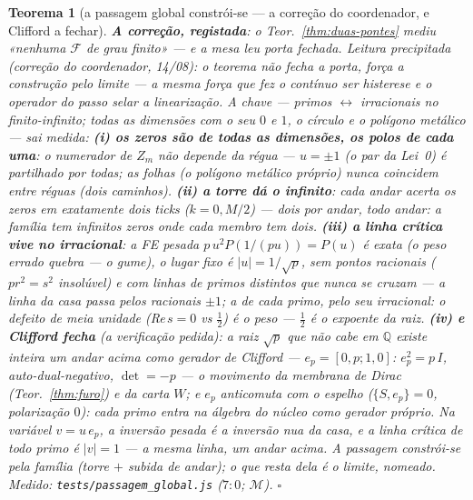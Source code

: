 \documentclass[11pt,a4paper]{article}
\newtheorem{teorema}{Teorema}
\newcommand{\code}[1]{\texttt{\small #1}}
\begin{document}
\begin{teorema}[a passagem global constrói-se --- a correção do
coordenador, e Clifford a fechar]\label{thm:passagem-global}
\textbf{A correção, registada}: o Teor.~\ref{thm:duas-pontes} mediu
«nenhuma $\mathcal{F}$ \emph{de grau finito}» --- e a mesa leu porta
fechada. Leitura precipitada (correção do coordenador, 14/08): o
teorema não fecha a porta, \emph{força a construção pelo limite} ---
a mesma força que fez o contínuo ser histerese e o operador do passo selar a
linearização. A chave --- \emph{primos $\leftrightarrow$ irracionais
no finito-infinito; todas as dimensões com o seu $0$ e $1$, o círculo
e o polígono metálico} --- sai medida:
\textbf{(i) os zeros são de todas as dimensões, os polos de cada
uma}: o numerador de $Z_{m}$ não depende da régua --- $u=\pm1$ (o par
da Lei~0) é partilhado por todas; as folhas (o polígono metálico
próprio) nunca coincidem entre réguas (dois caminhos).
\textbf{(ii) a torre dá o infinito}: cada andar acerta os zeros em
exatamente \emph{dois} ticks ($k=0,M/2$) --- dois por andar, todo
andar: a família tem infinitos zeros onde cada membro tem dois.
\textbf{(iii) a linha crítica vive no irracional}: a FE \emph{pesada}
$p\,u^{2}P(1/(pu))=P(u)$ é exata (o peso errado quebra --- o gume), o
lugar fixo é $|u|=1/\sqrt{p}$, \emph{sem pontos racionais}
($p r^{2}=s^{2}$ insolúvel) e com linhas de primos distintos que
nunca se cruzam --- a linha da casa passa pelos racionais $\pm1$; a
de cada primo, pelo seu irracional: \emph{o defeito de meia unidade
(Re$\,s=0$ vs $\tfrac12$) é o peso --- $\tfrac12$ é o expoente da
raiz}.
\textbf{(iv) e Clifford fecha} (a verificação pedida): a raiz
$\sqrt{p}$ que não cabe em $\mathbb{Q}$ existe \emph{inteira um andar
acima} como gerador de Clifford --- $e_{p}=[0,p;1,0]$:
$e_{p}^{2}=p\,I$, auto-dual-negativo, $\det=-p$ --- o movimento da
membrana de Dirac (Teor.~\ref{thm:furo}) e da carta $W$; e $e_{p}$
\emph{anticomuta com o espelho} ($\{S,e_{p}\}=0$, polarização $0$):
cada primo entra na álgebra do núcleo como gerador próprio. Na
variável $v=u\,e_{p}$, a inversão pesada é a inversão \emph{nua} da
casa, e a linha crítica de todo primo é $|v|=1$ --- \emph{a mesma
linha, um andar acima}. A passagem constrói-se pela família
(torre $+$ subida de andar); o que resta dela é o limite, nomeado.
\emph{Medido:} \code{tests/passagem\_global.js} ($7{:}0$;
$\mathcal{M}$).
$\square$
\end{teorema}
\end{document}
